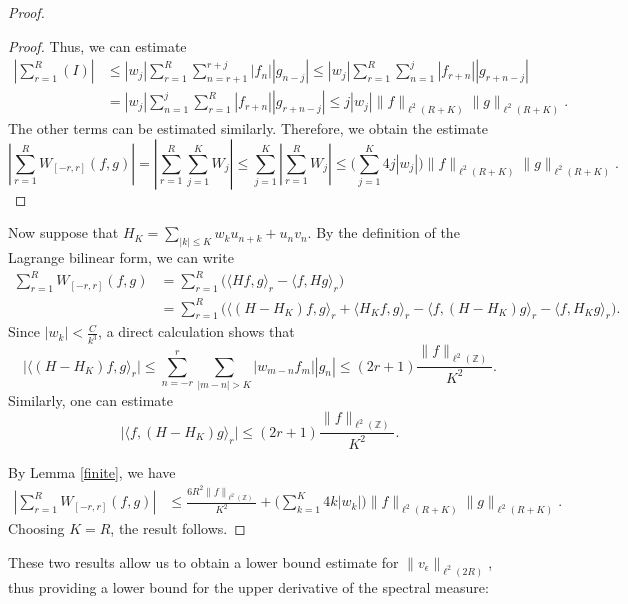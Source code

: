 \documentclass[11pt]{amsart}
\theoremstyle{remark}
\theoremstyle{definition}
\begin{document}
\begin{proof}
\begin{proof}
Thus, we can estimate \begin{align*}
\left| \sum_{r=1}^{R} (I) \right| &\leq |w_j| \sum_{r=1}^{R} \sum_{n=r+1}^{r+j} |f_n| |g_{n-j}| 
\leq |w_j| \sum_{r=1}^{R} \sum_{n=1}^{j} |f_{r+n}| |g_{r+n-j}| \\
&= |w_j| \sum_{n=1}^{j} \sum_{r=1}^{R} |f_{r+n}| |g_{r+n-j}| \leq j |w_j| \|f\|_{\ell^2(R+K)} \|g\|_{\ell^2(R+K)}.
\end{align*} The other terms can be estimated similarly. Therefore, we obtain the estimate $$
\left| \sum_{r=1}^{R} W_{[-r,r]}(f,g) \right| = \left| \sum_{r=1}^{R} \sum_{j=1}^{K} W_j \right| \leq \sum_{j=1}^{K} \left| \sum_{r=1}^{R} W_j \right| \leq \big(\sum_{j=1}^{K}4j|w_j| \big) \|f\|_{\ell^2(R+K)} \|g\|_{\ell^2(R+K)}.
$$ \end{proof}

Now suppose that $ H_K = \sum_{|k| \leq K} w_k u_{n+k} + u_n v_n $. By the definition of the Lagrange bilinear form, we can write $$
\begin{aligned}
\sum_{r=1}^{R} W_{[-r,r]}(f,g) &= \sum_{r=1}^{R} \big( \langle Hf, g \rangle_r - \langle f, Hg \rangle_r \big) \\
&= \sum_{r=1}^{R} \big( \langle (H-H_K)f, g \rangle_r + \langle H_K f, g \rangle_r - \langle f, (H-H_K)g \rangle_r - \langle f, H_K g \rangle_r \big).
\end{aligned}
$$ Since $ |w_k| < \frac{C}{k^3} $, a direct calculation shows that $$
\bigg| \langle (H-H_K)f, g \rangle_r \bigg| \leq \sum_{n=-r}^{r} \sum_{|m-n|>K} |w_{m-n} f_m| |g_n| \leq (2r+1) \frac{\|f\|_{\ell^2(\mathbb{Z})}}{K^2}.
$$ Similarly, one can estimate $$
\bigg| \langle f, (H-H_K)g \rangle_r \bigg| \leq (2r+1) \frac{\|f\|_{\ell^2(\mathbb{Z})}}{K^2}.
$$

By Lemma \ref{finite}, we have \begin{align*}
\left| \sum_{r=1}^{R} W_{[-r,r]}(f,g) \right| &\leq \frac{6R^2 \|f\|_{\ell^2(\mathbb{Z})}}{K^2} + \big(\sum_{k=1}^{K} 4k |w_k|\big) \|f\|_{\ell^2(R+K)} \|g\|_{\ell^2(R+K)}.
\end{align*} Choosing $ K = R $, the result follows. \end{proof}

These two results allow us to obtain a lower bound estimate for $ \|v_\epsilon\|_{\ell^2(2R)} $, thus providing a lower bound for the upper derivative of the spectral measure:
\end{document}
